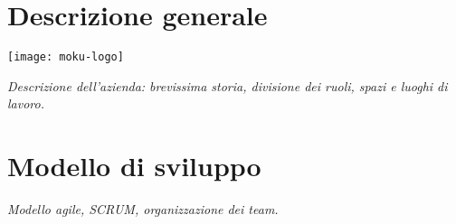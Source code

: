 \section{Descrizione generale}

\begin{center}
	\texttt{[image: moku-logo]}
\end{center}

\noindent \emph{Descrizione dell'azienda: brevissima storia, divisione dei ruoli, spazi e luoghi di lavoro.}

\section{Modello di sviluppo}
\emph{Modello agile, SCRUM, organizzazione dei team.}
